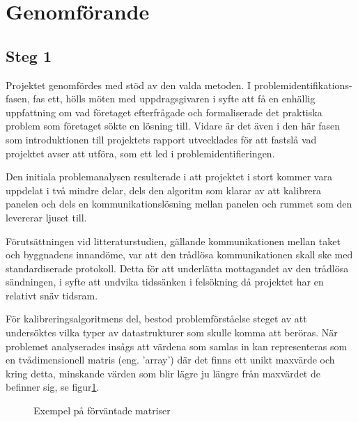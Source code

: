 \section{Genomförande} %
\label{sec:genomf_rande}
    \subsection{Steg 1} %
    \label{sub:steg_1}
        Projektet genomfördes med stöd av den valda metoden. I problemidentifikations-fasen, fas ett, hölls möten med uppdragsgivaren i syfte att få en enhällig uppfattning om vad företaget efterfrågade och formaliserade det praktiska problem som företaget sökte en lösning till. Vidare är det även i den här fasen som introduktionen till projektets rapport utvecklades för att fastslå vad projektet avser att utföra, som ett led i problemidentifieringen. \bigskip

        Den initiala problemanalysen resulterade i att projektet i stort kommer vara uppdelat i två mindre delar, dels den algoritm som klarar av att kalibrera panelen och dels en kommunikationslösning mellan panelen och rummet som den levererar ljuset till. \bigskip

        Förutsättningen vid litteraturstudien, gällande kommunikationen mellan taket och byggnadens innandöme, var att den trådlösa kommunikationen skall ske med standardiserade protokoll. Detta för att underlätta mottagandet av den trådlösa sändningen, i syfte att undvika tidssänken i felsökning då projektet har en relativt snäv tidsram.\bigskip

        För kalibreringsalgoritmens del, bestod problemförståelse steget av att undersöktes vilka typer av datastrukturer som skulle komma att beröras. När problemet analyserades insågs att värdena som samlas in kan representeras som en tvådimensionell matris (eng. 'array') där det finns ett unikt maxvärde och kring detta, minskande värden som blir lägre ju längre från maxvärdet de befinner sig, se figur\ref{fig:array}. \bigskip

        \begin{figure}[hbt]
        \centering
            \begin{subfigure}{0.2\textwidth}
            \end{subfigure}
            \begin{subfigure}{0.2\textwidth}
            \end{subfigure}
        \caption{\label{fig:array} Exempel på förväntade matriser}
        \end{figure}
